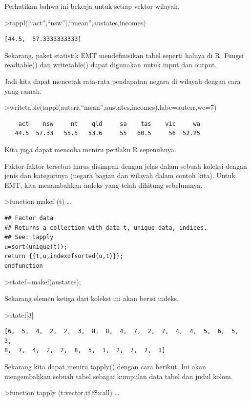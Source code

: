 \documentclass[
]{book}
\begin{document}
Perhatikan bahwa ini bekerja untuk setiap vektor wilayah.

\textgreater tappl({[}``act'',``nsw''{]},``mean'',austates,incomes)

\begin{verbatim}
[44.5,  57.3333333333]
\end{verbatim}

Sekarang, paket statistik EMT mendefinisikan tabel seperti halnya di R. Fungsi readtable() dan writetable() dapat digunakan untuk input dan output.

Jadi kita dapat mencetak rata-rata pendapatan negara di wilayah dengan cara yang ramah.

\textgreater writetable(tappl(auterr,``mean'',austates,incomes),labc=auterr,wc=7)

\begin{verbatim}
    act    nsw     nt    qld     sa    tas    vic     wa
   44.5  57.33   55.5   53.6     55   60.5     56  52.25
\end{verbatim}

Kita juga dapat mencoba meniru perilaku R sepenuhnya.

Faktor-faktor tersebut harus disimpan dengan jelas dalam sebuah koleksi dengan jenis dan kategorinya (negara bagian dan wilayah dalam contoh kita). Untuk EMT, kita menambahkan indeks yang telah dihitung sebelumnya.

\textgreater function makef (t) \ldots{}

\begin{verbatim}
## Factor data
## Returns a collection with data t, unique data, indices.
## See: tapply
u=sort(unique(t));
return {{t,u,indexofsorted(u,t)}};
endfunction
\end{verbatim}

\textgreater statef=makef(austates);

Sekarang elemen ketiga dari koleksi ini akan berisi indeks.

\textgreater statef{[}3{]}

\begin{verbatim}
[6,  5,  4,  2,  2,  3,  8,  8,  4,  7,  2,  7,  4,  4,  5,  6,  5,  3,
8,  7,  4,  2,  2,  8,  5,  1,  2,  7,  7,  1]
\end{verbatim}

Sekarang kita dapat meniru tapply() dengan cara berikut. Ini akan mengembalikan sebuah tabel sebagai kumpulan data tabel dan judul kolom.

\textgreater function tapply (t:vector,tf,f\$:call) \ldots{}
\end{document}

